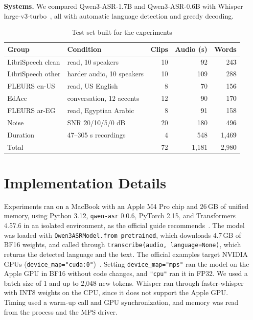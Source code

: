 \documentclass[conference]{IEEEtran}
\begin{document}
\textbf{Systems.} We compared Qwen3-ASR-1.7B and Qwen3-ASR-0.6B with Whisper large-v3-turbo~\cite{whisper}, all with automatic language detection and greedy decoding.

\begin{table}[t]
\centering
\caption{Test set built for the experiments}
\label{tab:data}
\setlength{\tabcolsep}{3pt}
\begin{tabular}{llrrr}
\toprule
Group & Condition & Clips & Audio (s) & Words \\
\midrule
LibriSpeech clean & read, 10 speakers & 10 & 92 & 243 \\
LibriSpeech other & harder audio, 10 speakers & 10 & 109 & 288 \\
FLEURS en-US & read, US English & 8 & 70 & 156 \\
EdAcc & conversation, 12 accents & 12 & 90 & 170 \\
FLEURS ar-EG & read, Egyptian Arabic & 8 & 91 & 158 \\
Noise & SNR 20/10/5/0 dB & 20 & 180 & 496 \\
Duration & 47--305 s recordings & 4 & 548 & 1{,}469 \\
\midrule
Total & & 72 & 1{,}181 & 2{,}980 \\
\bottomrule
\end{tabular}
\end{table}

\section{Implementation Details}
Experiments ran on a MacBook with an Apple M4 Pro chip and 26\,GB of unified memory, using Python 3.12, \texttt{qwen-asr} 0.0.6, PyTorch 2.15, and Transformers 4.57.6 in an isolated environment, as the official guide recommends~\cite{qwen3asrgit}. The model was loaded with \texttt{Qwen3ASRModel.from\_pretrained}, which downloads 4.7\,GB of BF16 weights, and called through \texttt{transcribe(audio, language=None)}, which returns the detected language and the text. The official examples target NVIDIA GPUs (\texttt{device\_map="cuda:0"})~\cite{qwen3asrgit}. Setting \texttt{device\_map="mps"} ran the model on the Apple GPU in BF16 without code changes, and \texttt{"cpu"} ran it in FP32. We used a batch size of 1 and up to 2,048 new tokens. Whisper ran through faster-whisper~\cite{fasterwhisper} with INT8 weights on the CPU, since it does not support the Apple GPU. Timing used a warm-up call and GPU synchronization, and memory was read from the process and the MPS driver.
\end{document}

